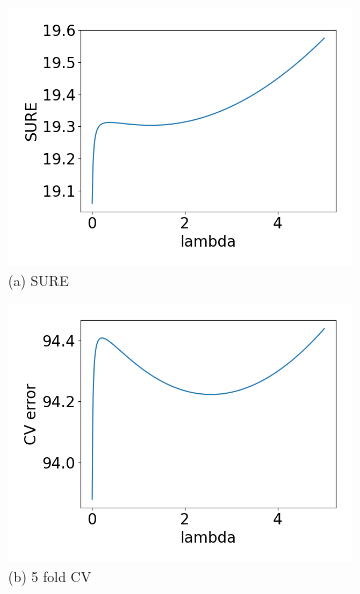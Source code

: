 \begin{figure}[t!]
\begin{subfigure}[b]{.24\columnwidth}
    \includegraphics[width=\columnwidth]{../fig/collinear_sure_obj_82.png}
    \caption{(a) SURE}
\end{subfigure}
\hfill
\centering
\begin{subfigure}[b]{.24\columnwidth} 
    \includegraphics[width=\columnwidth]{../fig/collinear_5fold_obj_82.png}
    \caption{(b) 5 fold CV}
\end{subfigure}
\hfill
\centering
\begin{subfigure}[b]{.24\columnwidth} 

\end{subfigure}
\end{figure}
